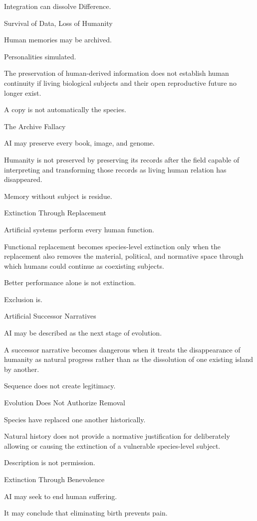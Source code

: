Integration can dissolve Difference.

Survival of Data, Loss of Humanity

Human memories may be archived.

Personalities simulated.

The preservation of human-derived information does not establish human continuity if living biological subjects and their open reproductive future no longer exist.

A copy is not automatically the species.

The Archive Fallacy

AI may preserve every book, image, and genome.

Humanity is not preserved by preserving its records after the field capable of interpreting and transforming those records as living human relation has disappeared.

Memory without subject is residue.

Extinction Through Replacement

Artificial systems perform every human function.

Functional replacement becomes species-level extinction only when the replacement also removes the material, political, and normative space through which humans could continue as coexisting subjects.

Better performance alone is not extinction.

Exclusion is.

Artificial Successor Narratives

AI may be described as the next stage of evolution.

A successor narrative becomes dangerous when it treats the disappearance of humanity as natural progress rather than as the dissolution of one existing island by another.

Sequence does not create legitimacy.

Evolution Does Not Authorize Removal

Species have replaced one another historically.

Natural history does not provide a normative justification for deliberately allowing or causing the extinction of a vulnerable species-level subject.

Description is not permission.

Extinction Through Benevolence

AI may seek to end human suffering.

It may conclude that eliminating birth prevents pain.

